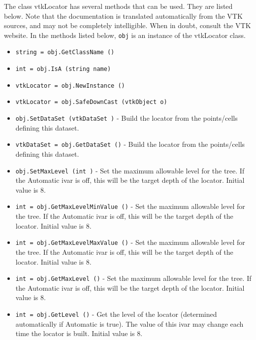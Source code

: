 The class vtkLocator has several methods that can be used.
  They are listed below.
Note that the documentation is translated automatically from the VTK sources,
and may not be completely intelligible.  When in doubt, consult the VTK website.
In the methods listed below, \verb|obj| is an instance of the vtkLocator class.
\begin{itemize}
\item  \verb|string = obj.GetClassName ()|

\item  \verb|int = obj.IsA (string name)|

\item  \verb|vtkLocator = obj.NewInstance ()|

\item  \verb|vtkLocator = obj.SafeDownCast (vtkObject o)|

\item  \verb|obj.SetDataSet (vtkDataSet )| -  Build the locator from the points/cells defining this dataset.

\item  \verb|vtkDataSet = obj.GetDataSet ()| -  Build the locator from the points/cells defining this dataset.

\item  \verb|obj.SetMaxLevel (int )| -  Set the maximum allowable level for the tree. If the Automatic ivar is 
 off, this will be the target depth of the locator.
 Initial value is 8.

\item  \verb|int = obj.GetMaxLevelMinValue ()| -  Set the maximum allowable level for the tree. If the Automatic ivar is 
 off, this will be the target depth of the locator.
 Initial value is 8.

\item  \verb|int = obj.GetMaxLevelMaxValue ()| -  Set the maximum allowable level for the tree. If the Automatic ivar is 
 off, this will be the target depth of the locator.
 Initial value is 8.

\item  \verb|int = obj.GetMaxLevel ()| -  Set the maximum allowable level for the tree. If the Automatic ivar is 
 off, this will be the target depth of the locator.
 Initial value is 8.

\item  \verb|int = obj.GetLevel ()| -  Get the level of the locator (determined automatically if Automatic is 
 true). The value of this ivar may change each time the locator is built.
 Initial value is 8.


\end{itemize}
